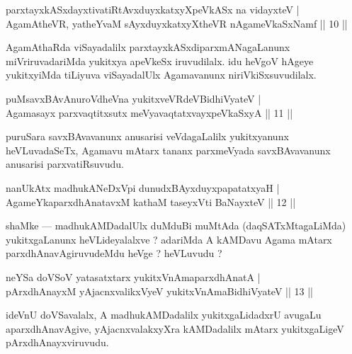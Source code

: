 \begin{shl}
parxtayxkASxdayxtivatiRtAvxduyxkatxyXpeVkASx na vidayxteV |\\
AgamAtheVR, yatheYvaM sAyxduyxkatxyXtheVR nA\s \s gameVkaSxNamf \hfill || 10 || 
\end{shl}

\begin{artha}
AgamAthaRda viSayadalilx parxtayxkASxdiparxmANagaLanunx miVriruvadariMda \-yukitxya apeVkeSx iruvudilalx. idu heVgoV hAgeye yukitxyiMda tiLiyuva viSayadalUlx Agamavanunx niriVkiSxsuvudilalx.
\end{artha}


\begin{shl}
puMsavxBAvAnuroVdheVna yukitxveVRdeV\s BidhiVyateV |\\
Agamasayx parxvaqtitxsutx meVyavaqtatxvayxpeVkaSxyA \hfill || 11 ||
\end{shl}

\begin{artha}
puruSara savxBAvavanunx anusarisi veVdagaLalilx yukitxyanunx heVLuvadaSeTx, Agamavu mAtarx tananx parxmeVyada savxBAvavanunx anusarisi parxvatiRsuvudu.
\end{artha}


\begin{shl}
nanUkAtx madhukANeDxV\s pi dunudxBAyxduyxpapatatxyaH |\\
AgameYkaparxdhAnatavxM kathaM taseyxVti BaNayxteV \hfill || 12 || 
\end{shl}

\begin{artha}
shaMke --- madhukAMDadalUlx duMduBi muMtAda (daqSATxMtagaLiMda) yukitxgaLanunx heVLideyalalxve ? adariMda A kAMDavu Agama mAtarx parxdhAnavAgiruvudeMdu heVge ? heVLuvudu ?
\end{artha}


\begin{shl}
neYSa doVSoV yatasatxtarx yukitxVnAmaparxdhAnatA |\\
pArxdhAnayxM yAjacnxvalikxVyeV yukitxVnAmaBidhiVyateV \hfill || 13 || 
\end{shl}

\begin{artha}
ideVnU doVSavalalx, A madhukAMDadalilx yukitxgaLidadxrU avugaLu aparxdhAnavAgive, yAjacnxvalakxyXra kAMDadalilx mAtarx yukitxgaLigeV pArxdhAnayxviruvudu.
\end{artha}

